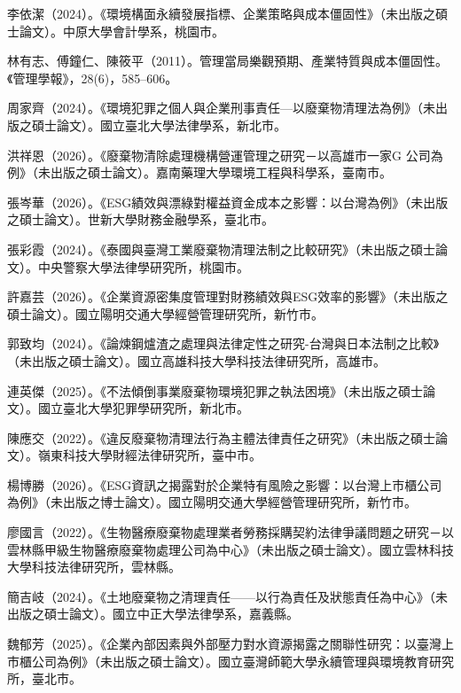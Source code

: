 \documentclass[12pt,a4paper]{article}
\begin{document}
\begin{enumerate}[label={[\arabic*]}, leftmargin=3em]
    \item 李依潔（2024）。《環境構面永續發展指標、企業策略與成本僵固性》（未出版之碩士論文）。中原大學會計學系，桃園市。
    \item 林有志、傅鐘仁、陳筱平（2011）。管理當局樂觀預期、產業特質與成本僵固性。《管理學報》，28(6)，585--606。
    \item 周家齊（2024）。《環境犯罪之個人與企業刑事責任—以廢棄物清理法為例》（未出版之碩士論文）。國立臺北大學法律學系，新北市。
    \item 洪祥恩（2026）。《廢棄物清除處理機構營運管理之研究－以高雄市一家G 公司為例》（未出版之碩士論文）。嘉南藥理大學環境工程與科學系，臺南市。
    \item 張岑華（2026）。《ESG績效與漂綠對權益資金成本之影響：以台灣為例》（未出版之碩士論文）。世新大學財務金融學系，臺北市。
    \item 張彩霞（2024）。《泰國與臺灣工業廢棄物清理法制之比較研究》（未出版之碩士論文）。中央警察大學法律學研究所，桃園市。
    \item 許嘉芸（2026）。《企業資源密集度管理對財務績效與ESG效率的影響》（未出版之碩士論文）。國立陽明交通大學經營管理研究所，新竹市。
    \item 郭致均（2024）。《論煉鋼爐渣之處理與法律定性之研究-台灣與日本法制之比較》（未出版之碩士論文）。國立高雄科技大學科技法律研究所，高雄市。
    \item 連英傑（2025）。《不法傾倒事業廢棄物環境犯罪之執法困境》（未出版之碩士論文）。國立臺北大學犯罪學研究所，新北市。
    \item 陳應交（2022）。《違反廢棄物清理法行為主體法律責任之研究》（未出版之碩士論文）。嶺東科技大學財經法律研究所，臺中市。
    \item 楊博勝（2026）。《ESG資訊之揭露對於企業特有風險之影響：以台灣上市櫃公司為例》（未出版之博士論文）。國立陽明交通大學經營管理研究所，新竹市。
    \item 廖國言（2022）。《生物醫療廢棄物處理業者勞務採購契約法律爭議問題之研究－以雲林縣甲級生物醫療廢棄物處理公司為中心》（未出版之碩士論文）。國立雲林科技大學科技法律研究所，雲林縣。
    \item 簡吉岐（2024）。《土地廢棄物之清理責任——以行為責任及狀態責任為中心》（未出版之碩士論文）。國立中正大學法律學系，嘉義縣。
    \item 魏郁芳（2025）。《企業內部因素與外部壓力對水資源揭露之關聯性研究：以臺灣上市櫃公司為例》（未出版之碩士論文）。國立臺灣師範大學永續管理與環境教育研究所，臺北市。
\end{enumerate}
\end{document}
